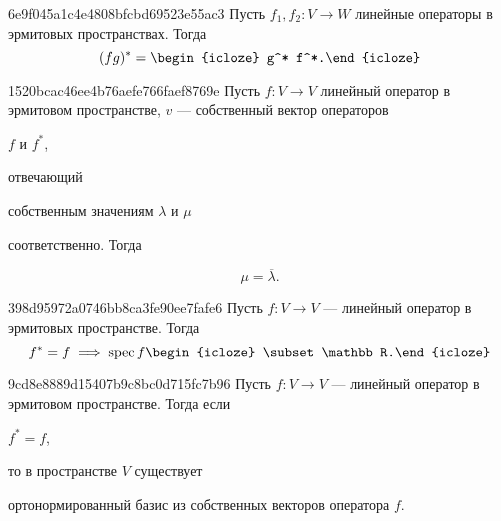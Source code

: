 \begin{note}{6e9f045a1c4e4808bfcbd69523e55ac3}
    Пусть \({ f_1, f_2 : V \to W }\) линейные операторы в эрмитовых пространствах.
    Тогда
    \[
        (fg)^* = \begin{icloze}{1}g^* f^*.\end{icloze}
    \]
\end{note}

\begin{note}{1520bcac46ee4b76aefe766faef8769e}
    Пусть \({ f : V \to V }\) линейный оператор в эрмитовом пространстве, \({ v }\) --- собственный вектор операторов \begin{icloze}{2}\({ f }\) и \({ f^* }\),\end{icloze} отвечающий \begin{icloze}{3}собственным значениям \({ \lambda }\) и \({ \mu }\)\end{icloze} соответственно.
    Тогда
    \begin{icloze}{1}
        \[
            \mu = \overline{\lambda}.
        \]
    \end{icloze}
\end{note}

\begin{note}{398d95972a0746bb8ca3fe90ee7fafe6}
    Пусть \({ f : V \to V }\) --- линейный оператор в эрмитовых пространстве.
    Тогда
    \[
        f^* = f \implies \operatorname{spec} f \begin{icloze}{1}\subset \mathbb R.\end{icloze}
    \]
\end{note}

\begin{note}{9cd8e8889d15407b9c8bc0d715fc7b96}
    Пусть \({ f : V \to V }\) --- линейный оператор в эрмитовом пространстве.
    Тогда если \begin{icloze}{2}\({ f^* = f }\),\end{icloze} то в пространстве \({ V }\) существует \begin{icloze}{1}ортонормированный базис из собственных векторов оператора \({ f }\).\end{icloze}
\end{note}



